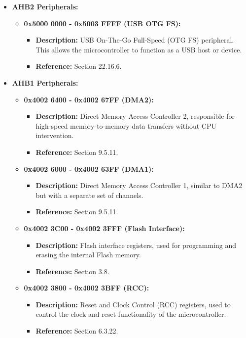 \documentclass{article}
\begin{document}
\begin{itemize}
    \item \textbf{AHB2 Peripherals:}
    \begin{itemize}
        \item \textbf{0x5000 0000 - 0x5003 FFFF (USB OTG FS):} 
        \begin{itemize}
            \item \textbf{Description:} USB On-The-Go Full-Speed (OTG FS) peripheral. This allows the microcontroller to function as a USB host or device.
            \item \textbf{Reference:} Section 22.16.6.
        \end{itemize}
    \end{itemize}
    
    \item \textbf{AHB1 Peripherals:}
    \begin{itemize}
        \item \textbf{0x4002 6400 - 0x4002 67FF (DMA2):} 
        \begin{itemize}
            \item \textbf{Description:} Direct Memory Access Controller 2, responsible for high-speed memory-to-memory data transfers without CPU intervention.
            \item \textbf{Reference:} Section 9.5.11.
        \end{itemize}
        
        \item \textbf{0x4002 6000 - 0x4002 63FF (DMA1):} 
        \begin{itemize}
            \item \textbf{Description:} Direct Memory Access Controller 1, similar to DMA2 but with a separate set of channels.
            \item \textbf{Reference:} Section 9.5.11.
        \end{itemize}
        
        \item \textbf{0x4002 3C00 - 0x4002 3FFF (Flash Interface):} 
        \begin{itemize}
            \item \textbf{Description:} Flash interface registers, used for programming and erasing the internal Flash memory.
            \item \textbf{Reference:} Section 3.8.
        \end{itemize}
        
        \item \textbf{0x4002 3800 - 0x4002 3BFF (RCC):} 
        \begin{itemize}
            \item \textbf{Description:} Reset and Clock Control (RCC) registers, used to control the clock and reset functionality of the microcontroller.
            \item \textbf{Reference:} Section 6.3.22.
        \end{itemize}
        

\end{itemize}
\end{itemize}
\end{document}
